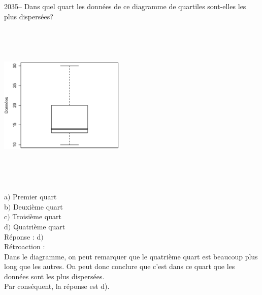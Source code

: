 \documentclass[letterpaper, 12pt]{article}
\begin{document}
2035-- Dans quel quart les donn\'ees de ce diagramme de quartiles sont-elles les plus dispers\'ees?
\begin{center}
 \includegraphics[width=6cm,height=8cm,angle=-90]{Q2035.eps}
\end{center}

a$)$ Premier quart\\
b$)$ Deuxi\`eme quart\\
c$)$ Troisi\`eme quart\\
d$)$ Quatri\`eme quart\\

R\'eponse : d$)$\\

R\'etroaction :\\
Dans le diagramme, on peut remarquer que le quatri\`eme quart est beaucoup plus long que les autres. On peut donc conclure que c'est dans ce quart que les donn\'ees sont les plus dispers\'ees. \\
Par cons\'equent, la r\'eponse est d).\\

\end{document}

